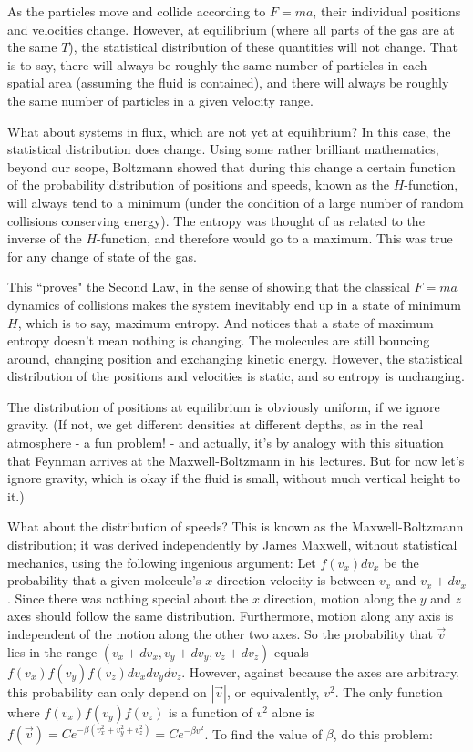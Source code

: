 \documentclass[12pt]{article}
\begin{document}
As the particles move and collide according to $F=ma$, their individual positions and velocities change. However, at equilibrium (where all parts of the gas are at the same $T$), the statistical distribution of these quantities will not change. That is to say, there will always be roughly the same number of particles in each spatial area (assuming the fluid is contained), and there will always be roughly the same number of particles in a given velocity range.

What about systems in flux, which are not yet at equilibrium? In this case, the statistical distribution does change. Using some rather brilliant mathematics, beyond our scope, Boltzmann showed that during this change a certain function of the probability distribution of positions and speeds, known as the $H$-function, will always tend to a minimum (under the condition of a large number of random collisions conserving energy). The entropy was thought of as related to the inverse of the $H$-function, and therefore would go to a maximum. This was true for any change of state of the gas.

This ``proves" the Second Law, in the sense of showing that the classical $F=ma$ dynamics of collisions makes the system inevitably end up in a state of minimum $H$, which is to say, maximum entropy. And notices that a state of maximum entropy doesn't mean nothing is changing. The molecules are still bouncing around, changing position and exchanging kinetic energy. However, the statistical distribution of the positions and velocities is static, and so entropy is unchanging.

The distribution of positions at equilibrium is obviously uniform, if we ignore gravity. (If not, we get different densities at different depths, as in the real atmosphere - a fun problem! - and actually, it's by analogy with this situation that Feynman arrives at the Maxwell-Boltzmann in his lectures. But for now let's ignore gravity, which is okay if the fluid is small, without much vertical height to it.) 

What about the distribution of speeds? This is known as the Maxwell-Boltzmann distribution; it was derived independently by James Maxwell, without statistical mechanics, using the following ingenious argument:  Let $f(v_x)dv_x$ be the probability that a given molecule's $x$-direction velocity is between $v_x$ and $v_x+dv_x$. Since there was nothing special about the $x$ direction, motion along the $y$ and $z$ axes should follow the same distribution. Furthermore, motion along any axis is independent of the motion along the other two axes. So the probability that $\vec{v}$ lies in the range $(v_x+dv_x, v_y+dv_y, v_z+dv_z)$ equals $f(v_x)f(v_y)f(v_z)dv_xdv_ydv_z$. However, against because the axes are arbitrary, this probability can only depend on $|\vec{v}|$, or equivalently, $v^2$. The only function where $f(v_x)f(v_y)f(v_z)$ is a function of $v^2$ alone is $f(\vec{v})= Ce^{-\beta(v_x^2+v_y^2+v_z^2)}=Ce^{-\beta v^2}$. To find the value of $\beta$, do this problem:
\end{document}
